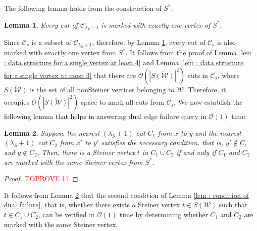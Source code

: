 \documentclass[letterpaper,11pt]{article}
\newtheorem{lemma}{Lemma}[]
\begin{document}
The following lemma holds from the construction of $S^*$.
\begin{lemma} \label{lem : a cut is marked with exactly one steiner vertex}
    Every cut of ${\mathcal C}_{\lambda_S+1}$ is marked with exactly one vertex of $S^*$. 
\end{lemma}
Since ${\mathcal C}_s$ is a subset of ${\mathcal C}_{\lambda_S+1}$, therefore, by Lemma \ref{lem : a cut is marked with exactly one steiner vertex}, every cut of ${\mathcal C}_s$ is also marked with exactly one vertex from $S^*$. It follows from the proof of Lemma \ref{lem : data structure for a single vertex at least 4} and Lemma \ref{lem : data structure for a single vertex at most 3} that there are ${\mathcal O}(|\overline{S({\mathcal W})}|^2)$ cuts in ${\mathcal C}_s$, where $\overline{S({\mathcal W})}$ is the set of all nonSteiner vertices belonging to ${\mathcal W}$. Therefore, it occupies ${\mathcal O}(|\overline{S({\mathcal W})}|^2)$ space to mark all cuts from ${\mathcal C}_s$. We now establish the following lemma that helps in answering dual edge failure query in ${\mathcal O}(1)$ time.
\begin{lemma} \label{lem : verifying third condition in constant}
    Suppose the nearest $(\lambda_S+1)$ cut $C_1$ from $x$ to $y$ and the nearest $(\lambda_S+1)$ cut $C_2$ from $x'$ to $y'$ satisfies the necessary condition, that is, $y'\notin  C_1$ and $y\notin C_2$. Then, there is a Steiner vertex $t$ in $\overline{C_1\cup C_2}$ if and only if $C_1$ and $C_2$ are marked with the same Steiner vertex from $S^*$.
\end{lemma}
\begin{proof}\textcolor{red}{TOPROVE 17}\end{proof}
It follows from Lemma \ref{lem : verifying third condition in constant} that the second condition of Lemma \ref{lem : condition of dual failure}, that is, whether there exists a Steiner vertex $t\in S({\mathcal W})$ such that $t\in \overline{C_1\cup C_2}$, can be verified in ${\mathcal O}(1)$ time by determining whether $C_1$ and $C_2$ are marked with the same Steiner vertex.
\end{document}
